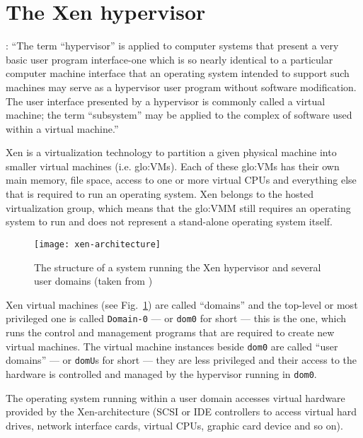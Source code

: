 \section{The Xen hypervisor}
\label{sec:xen-hypervisor}

\cite{hendricks79}: ``The term “hypervisor” is applied to computer systems
that present a very basic  user program interface-one which is so nearly
identical to a  particular computer machine interface that  an operating
system intended  to support such machines  may serve as  a hypervisor user
program without  software modification. The user interface  presented by a
hypervisor is commonly called a  virtual machine; the term “subsystem” may
be applied to the complex of software used within a virtual machine.''

Xen  \cite{xen}  is  a  virtualization  technology to  partition  a  given
physical machine into smaller virtual machines (i.e. \gls{glo:VM}s).  Each
of these  \gls{glo:VM}s has their own  main memory, file  space, access to
one or  more virtual CPUs and everything  else that is required  to run an
operating system.   Xen belongs to the hosted  virtualization group, which
means that the \gls{glo:VMM} still requires an operating system to run and
does not represent a stand-alone operating system itself.

\begin{figure}[htbp]
  \begin{center}
    \texttt{[image: xen-architecture]}
  \end{center}
  \caption[Xen architecture]{The structure of a system running the Xen
    hypervisor and several user domains (taken from \cite{xen-art})}
  \label{fig:xen-architecture}
\end{figure}

Xen  virtual  machines  (see Fig.~\ref{fig:xen-architecture})  are  called
``domains''  and   the  top-level  or   most  privileged  one   is  called
\texttt{Domain-0}  --- or  \texttt{dom0} for  short ---  this is  the one,
which runs the control and management programs that are required to create
new virtual machines.  The  virtual machine instances beside \texttt{dom0}
are called ``user  domains'' --- or \texttt{domU}s for  short --- they are
less privileged and their access to the hardware is controlled and managed
by the hypervisor running in \texttt{dom0}.

The  operating  system  running  within  a user  domain  accesses  virtual
hardware  provided by  the Xen-architecture  (SCSI or  IDE  controllers to
access virtual hard drives, network interface cards, virtual CPUs, graphic
card device and so on).


